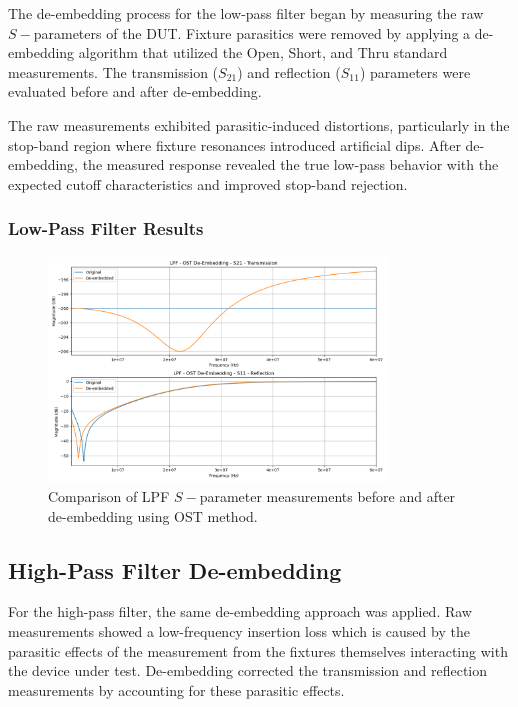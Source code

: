 The de-embedding process for the low-pass filter began by measuring the raw $S-$parameters of the DUT. Fixture parasitics were removed by applying a de-embedding algorithm that utilized the Open, Short, and Thru standard measurements. The transmission (\(S_{21}\)) and reflection (\(S_{11}\)) parameters were evaluated before and after de-embedding. \cite{moon2015comparison}

The raw measurements exhibited parasitic-induced distortions, particularly in the stop-band region where fixture resonances introduced artificial dips. \cite{tang2024novel} After de-embedding, the measured response revealed the true low-pass behavior with the expected cutoff characteristics and improved stop-band rejection.

\subsubsection{Low-Pass Filter Results}
\begin{figure}[H]
\centering
\includegraphics[width=0.8\textwidth]{Chapter_8/images/Lab_08_lpf_deembedded_comparison.png}
\caption{Comparison of LPF $S-$parameter measurements before and after de-embedding using OST method.}
\label{Ch8_fig:5}
\end{figure}


\subsection{High-Pass Filter De-embedding}
\justifying

For the high-pass filter, the same de-embedding approach was applied. Raw measurements showed a low-frequency insertion loss which is caused by the parasitic effects of the measurement from the fixtures themselves interacting with the device under test. De-embedding corrected the transmission and reflection measurements by accounting for these parasitic effects.

